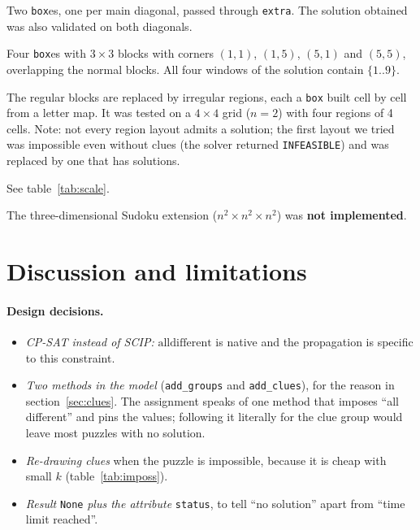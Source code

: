 \documentclass[11pt,a4paper]{article}
\newcommand{\alldiff}{\mathrm{alldifferent}}
\begin{document}
\begin{description}[leftmargin=1.5em]
  \item[Diagonal Sudoku (X-Sudoku).] Two \texttt{box}es, one per main diagonal, passed through \texttt{extra}. The solution obtained was also validated on both diagonals.
  \item[Hyper-Sudoku / Windoku.] Four \texttt{box}es with $3\times 3$ blocks with corners $(1,1)$, $(1,5)$, $(5,1)$ and $(5,5)$, overlapping the normal blocks. All four windows of the solution contain $\{1..9\}$.
  \item[Irregular Sudoku (jigsaw).] The regular blocks are replaced by irregular regions, each a \texttt{box} built cell by cell from a letter map. It was tested on a $4\times 4$ grid ($n=2$) with four regions of 4 cells. Note: not every region layout admits a solution; the first layout we tried was impossible even without clues (the solver returned \texttt{INFEASIBLE}) and was replaced by one that has solutions.
  \item[Scale.] See table~\ref{tab:scale}.
\end{description}

The three-dimensional Sudoku extension ($n^2\times n^2\times n^2$) was \textbf{not implemented}.

\section{Discussion and limitations}\label{sec:disc}

\paragraph{Design decisions.}
\begin{itemize}
  \item \emph{CP-SAT instead of SCIP:} $\alldiff$ is native and the propagation is specific to this constraint.
  \item \emph{Two methods in the model} (\texttt{add\_groups} and \texttt{add\_clues}), for the reason in section~\ref{sec:clues}. The assignment speaks of one method that imposes ``all different'' and pins the values; following it literally for the clue group would leave most puzzles with no solution.
  \item \emph{Re-drawing clues} when the puzzle is impossible, because it is cheap with small $k$ (table~\ref{tab:imposs}).
  \item \emph{Result} \texttt{None} \emph{plus the attribute} \texttt{status}, to tell ``no solution'' apart from ``time limit reached''.
\end{itemize}
\end{document}
